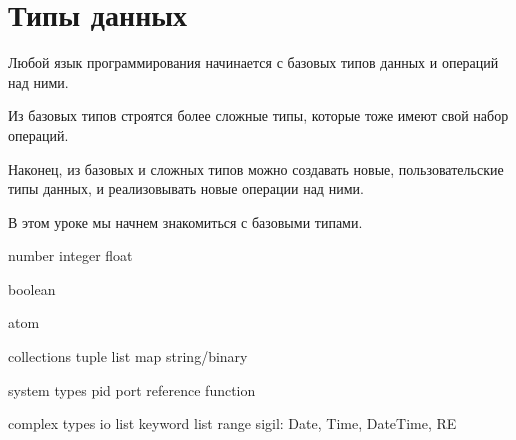 \chapter{Типы данных}

Любой язык программирования начинается с базовых типов данных и операций над ними.

Из базовых типов строятся более сложные типы, которые тоже имеют свой набор операций.

Наконец, из базовых и сложных типов можно создавать новые, пользовательские типы данных, и реализовывать новые операции над ними.

В этом уроке мы начнем знакомиться с базовыми типами.

number
  integer
  float

boolean

atom

collections
  tuple
  list
  map
  string/binary

system types
  pid
  port
  reference
  function

complex types
  io list
  keyword list
  range
  sigil: Date, Time, DateTime, RE
